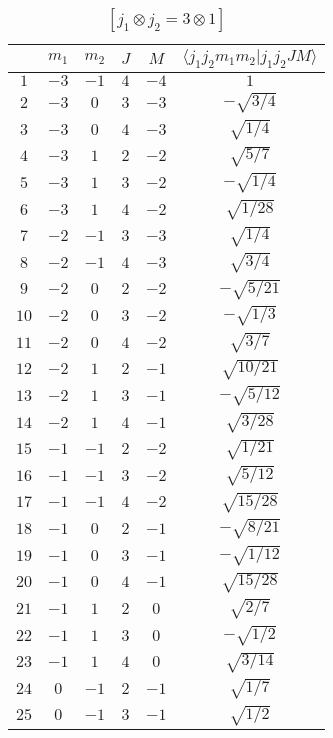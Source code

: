 \begin{table}
\tiny
\caption{$[j_1 \otimes j_2 = 3 \otimes 1]$}
\begin{center}
\begin{tabular}{|c|c|c|c|c|c|}
\hline 
   & $m_1$ & $m_2$ & $J$ & $M$ & $\langle j_1 j_2 m_1 m_2 | j_1 j_2 J M \rangle$ \\ 
\hline 
$1$ & $-3$ & $-1$ & $4$ & $-4$ & $1$ \\ 
$2$ & $-3$ & $0$ & $3$ & $-3$ & $-\sqrt{3/4}$ \\ 
$3$ & $-3$ & $0$ & $4$ & $-3$ & $\sqrt{1/4}$ \\ 
$4$ & $-3$ & $1$ & $2$ & $-2$ & $\sqrt{5/7}$ \\ 
$5$ & $-3$ & $1$ & $3$ & $-2$ & $-\sqrt{1/4}$ \\ 
$6$ & $-3$ & $1$ & $4$ & $-2$ & $\sqrt{1/28}$ \\ 
$7$ & $-2$ & $-1$ & $3$ & $-3$ & $\sqrt{1/4}$ \\ 
$8$ & $-2$ & $-1$ & $4$ & $-3$ & $\sqrt{3/4}$ \\ 
$9$ & $-2$ & $0$ & $2$ & $-2$ & $-\sqrt{5/21}$ \\ 
$10$ & $-2$ & $0$ & $3$ & $-2$ & $-\sqrt{1/3}$ \\ 
$11$ & $-2$ & $0$ & $4$ & $-2$ & $\sqrt{3/7}$ \\ 
$12$ & $-2$ & $1$ & $2$ & $-1$ & $\sqrt{10/21}$ \\ 
$13$ & $-2$ & $1$ & $3$ & $-1$ & $-\sqrt{5/12}$ \\ 
$14$ & $-2$ & $1$ & $4$ & $-1$ & $\sqrt{3/28}$ \\ 
$15$ & $-1$ & $-1$ & $2$ & $-2$ & $\sqrt{1/21}$ \\ 
$16$ & $-1$ & $-1$ & $3$ & $-2$ & $\sqrt{5/12}$ \\ 
$17$ & $-1$ & $-1$ & $4$ & $-2$ & $\sqrt{15/28}$ \\ 
$18$ & $-1$ & $0$ & $2$ & $-1$ & $-\sqrt{8/21}$ \\ 
$19$ & $-1$ & $0$ & $3$ & $-1$ & $-\sqrt{1/12}$ \\ 
$20$ & $-1$ & $0$ & $4$ & $-1$ & $\sqrt{15/28}$ \\ 
$21$ & $-1$ & $1$ & $2$ & $0$ & $\sqrt{2/7}$ \\ 
$22$ & $-1$ & $1$ & $3$ & $0$ & $-\sqrt{1/2}$ \\ 
$23$ & $-1$ & $1$ & $4$ & $0$ & $\sqrt{3/14}$ \\ 
$24$ & $0$ & $-1$ & $2$ & $-1$ & $\sqrt{1/7}$ \\ 
$25$ & $0$ & $-1$ & $3$ & $-1$ & $\sqrt{1/2}$ \\ 

\end{tabular}
\end{center}
\end{table}
